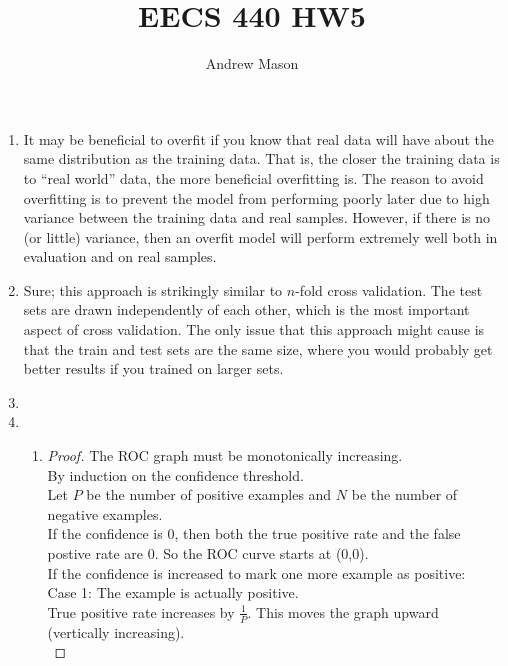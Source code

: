 \documentclass[12pt]{article}
\title{EECS 440 HW5}
\author{Andrew Mason}
\begin{document}
\maketitle

\begin{enumerate}
  \item
    It may be beneficial to overfit if you know that real data will have about
    the same distribution as the training data. That is, the closer the
    training data is to ``real world'' data, the more beneficial overfitting
    is. The reason to avoid overfitting is to prevent the model from performing
    poorly later due to high variance between the training data and real
    samples. However, if there is no (or little) variance, then an overfit
    model will perform extremely well both in evaluation and on real samples.\\
  \item
    Sure; this approach is strikingly similar to $n$-fold cross validation. The
    test sets are drawn independently of each other, which is the most important
    aspect of cross validation. The only issue that this approach might cause is
    that the train and test sets are the same size, where you would probably get
    better results if you trained on larger sets.\\
  \item
  \item
    \begin{enumerate}
      \item
        \begin{proof} The ROC graph must be monotonically increasing.\\
        By induction on the confidence threshold.\\
        Let $P$ be the number of positive examples and $N$ be the number of
        negative examples.\\
        If the confidence is 0, then both the true positive rate and the
        false postive rate are 0. So the ROC curve starts at (0,0).\\

        If the confidence is increased to mark one more example as positive:\\

        Case 1: The example is actually positive.\\
        True positive rate increases by $\frac{1}{P}$. This moves the graph
        upward (vertically increasing).\\


\end{proof}
\end{enumerate}
\end{enumerate}
\end{document}
